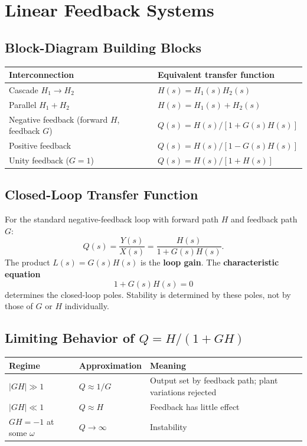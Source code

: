 \documentclass[10pt]{article}
\begin{document}
\section{Linear Feedback Systems}

\subsection{Block-Diagram Building Blocks}
\begin{center}
\begin{tabular}{@{}ll@{}}
\toprule
Interconnection & Equivalent transfer function \\
\midrule
Cascade $H_1\to H_2$ & $H(s) = H_1(s)H_2(s)$ \\
Parallel $H_1+H_2$ & $H(s) = H_1(s)+H_2(s)$ \\
Negative feedback (forward $H$, feedback $G$) & $Q(s) = H(s)/[1+G(s)H(s)]$ \\
Positive feedback & $Q(s) = H(s)/[1-G(s)H(s)]$ \\
Unity feedback ($G=1$) & $Q(s) = H(s)/[1+H(s)]$ \\
\bottomrule
\end{tabular}
\end{center}

\subsection{Closed-Loop Transfer Function}
For the standard negative-feedback loop with forward path $H$ and feedback
path $G$:
\[
\boxed{\,Q(s) = \frac{Y(s)}{X(s)} = \frac{H(s)}{1 + G(s)H(s)}.\,}
\]
The product $L(s) = G(s)H(s)$ is the \textbf{loop gain}. The
\textbf{characteristic equation}
\[
1 + G(s)H(s) = 0
\]
determines the closed-loop poles. Stability is determined by these poles,
not by those of $G$ or $H$ individually.

\subsection{Limiting Behavior of $Q = H/(1+GH)$}
\begin{center}
\begin{tabular}{@{}lll@{}}
\toprule
Regime & Approximation & Meaning \\
\midrule
$|GH|\gg 1$ & $Q\approx 1/G$ & Output set by feedback path; plant variations rejected \\
$|GH|\ll 1$ & $Q\approx H$ & Feedback has little effect \\
$GH = -1$ at some $\omega$ & $Q\to\infty$ & Instability \\
\bottomrule
\end{tabular}
\end{center}
\end{document}
